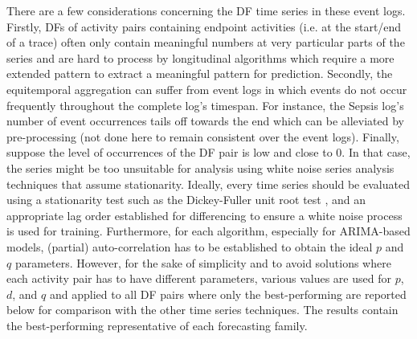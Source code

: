 \vspace{-1cm}
There are a few considerations concerning the DF time series in these event logs.
Firstly, DFs of activity pairs containing endpoint activities (i.e. at the start/end of a trace) often only contain meaningful numbers at very particular parts of the series and are hard to process by longitudinal algorithms which require a more extended pattern to extract a meaningful pattern for prediction.
Secondly, the equitemporal aggregation can suffer from event logs in which events do not occur frequently throughout the complete log's timespan.
For instance, the Sepsis log's number of event occurrences tails off towards the end which can be alleviated by pre-processing (not done here to remain consistent over the event logs).
Finally, suppose the level of occurrences of the DF pair is low and close to 0. In that case, the series might be too unsuitable for analysis using white noise series analysis techniques that assume stationarity.
Ideally, every time series should be evaluated using a stationarity test such as the Dickey-Fuller unit root test \cite{leybourne1995testing}, and an appropriate lag order established for differencing to ensure a white noise process is used for training. 
Furthermore, for each algorithm, especially for ARIMA-based models, (partial) auto-correlation has to be established to obtain the ideal $p$ and $q$ parameters.
However, for the sake of simplicity and to avoid solutions where each activity pair has to have different parameters, various values are used for $p$, $d$, and $q$ and applied to all DF pairs where only the best-performing are reported below for comparison with the other time series techniques.
The results contain the best-performing representative of each forecasting family.

